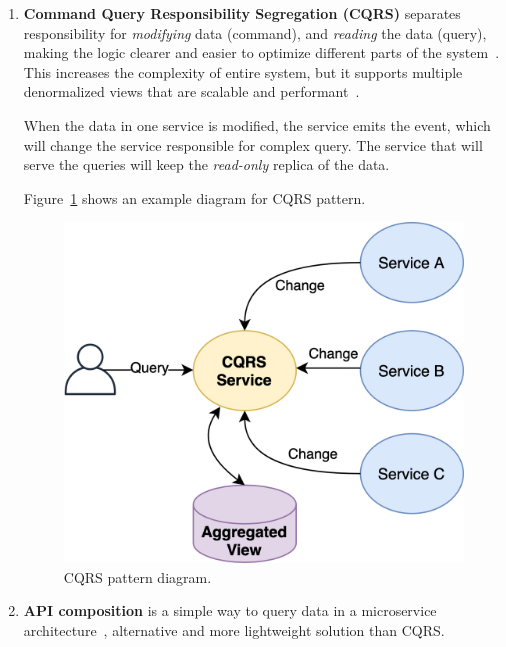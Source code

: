 \begin{enumerate}
	\item \textbf{Command Query Responsibility Segregation (CQRS)}\label{par:cqrs} separates responsibility for \emph{modifying} data (command), and \emph{reading} the data (query), making the logic clearer and easier to optimize different parts of the system~\cite{richardson2018microservices, 8101372}. This increases the complexity of entire system, but it supports multiple denormalized views that are scalable and performant~\cite{richardson2018microservices}. 
	
	When the data in one service is modified, the service emits the event, which will change the service responsible for complex query. The service that will serve the queries will keep the \emph{read-only} replica of the data. 
	
	Figure~\ref{fig:fig21} shows an example diagram for CQRS pattern.
	
	\begin{figure}[H]
		\begin{center}
			\includegraphics[scale=0.7]{images/Figure21}
		\end{center}
		\vspace{-0.6cm}
		\caption{CQRS pattern diagram.}
		\label{fig:fig21}
	\end{figure}

	\item \textbf{API composition}\label{par:composition} is a simple way to query data in a microservice architecture~\cite{richardson2018microservices, 8890660}, alternative and more lightweight solution than CQRS. 
	

\end{enumerate}
